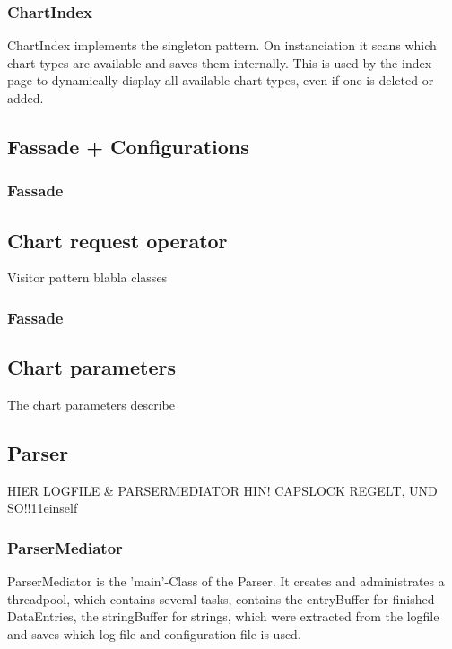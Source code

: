 \subsubsection*{ChartIndex}
ChartIndex implements the singleton pattern. On instanciation it scans which chart types are available 
and saves them internally. This is used by the index page to dynamically display all available chart types,
even if one is deleted or added.

\subsection{Fassade + Configurations}
\subsubsection{Fassade}


\subsection{Chart request operator}
Visitor pattern blabla
classes
\subsubsection{Fassade}

\subsection{Chart parameters}
The chart parameters describe 

\subsection{}


\subsection{Parser}

HIER LOGFILE & PARSERMEDIATOR HIN!
CAPSLOCK REGELT, UND SO!!11einself

\subsubsection*{ParserMediator}
ParserMediator is the 'main'-Class of the Parser. It creates and administrates a threadpool, which contains several tasks, 
contains the entryBuffer for finished DataEntries, the stringBuffer for strings, which were extracted
from the logfile and saves which log file and configuration file is used.

